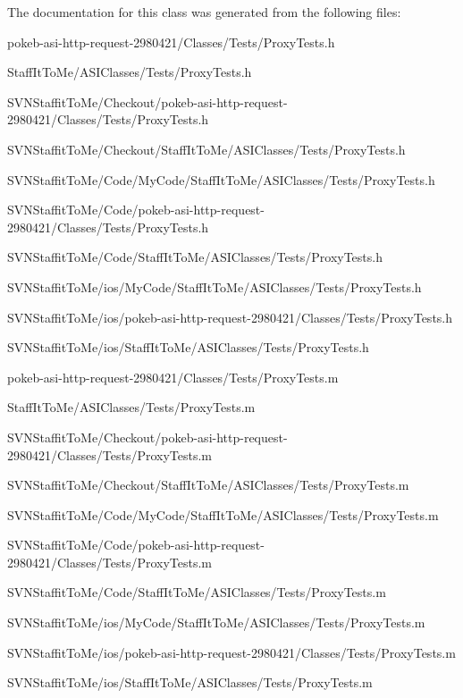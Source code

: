 \-The documentation for this class was generated from the following files\-:\begin{DoxyCompactItemize}
\item 
pokeb-\/asi-\/http-\/request-\/2980421/\-Classes/\-Tests/\-Proxy\-Tests.\-h\item 
\-Staff\-It\-To\-Me/\-A\-S\-I\-Classes/\-Tests/\-Proxy\-Tests.\-h\item 
\-S\-V\-N\-Staffit\-To\-Me/\-Checkout/pokeb-\/asi-\/http-\/request-\/2980421/\-Classes/\-Tests/\-Proxy\-Tests.\-h\item 
\-S\-V\-N\-Staffit\-To\-Me/\-Checkout/\-Staff\-It\-To\-Me/\-A\-S\-I\-Classes/\-Tests/\-Proxy\-Tests.\-h\item 
\-S\-V\-N\-Staffit\-To\-Me/\-Code/\-My\-Code/\-Staff\-It\-To\-Me/\-A\-S\-I\-Classes/\-Tests/\-Proxy\-Tests.\-h\item 
\-S\-V\-N\-Staffit\-To\-Me/\-Code/pokeb-\/asi-\/http-\/request-\/2980421/\-Classes/\-Tests/\-Proxy\-Tests.\-h\item 
\-S\-V\-N\-Staffit\-To\-Me/\-Code/\-Staff\-It\-To\-Me/\-A\-S\-I\-Classes/\-Tests/\-Proxy\-Tests.\-h\item 
\-S\-V\-N\-Staffit\-To\-Me/ios/\-My\-Code/\-Staff\-It\-To\-Me/\-A\-S\-I\-Classes/\-Tests/\-Proxy\-Tests.\-h\item 
\-S\-V\-N\-Staffit\-To\-Me/ios/pokeb-\/asi-\/http-\/request-\/2980421/\-Classes/\-Tests/\-Proxy\-Tests.\-h\item 
\-S\-V\-N\-Staffit\-To\-Me/ios/\-Staff\-It\-To\-Me/\-A\-S\-I\-Classes/\-Tests/\-Proxy\-Tests.\-h\item 
pokeb-\/asi-\/http-\/request-\/2980421/\-Classes/\-Tests/\-Proxy\-Tests.\-m\item 
\-Staff\-It\-To\-Me/\-A\-S\-I\-Classes/\-Tests/\-Proxy\-Tests.\-m\item 
\-S\-V\-N\-Staffit\-To\-Me/\-Checkout/pokeb-\/asi-\/http-\/request-\/2980421/\-Classes/\-Tests/\-Proxy\-Tests.\-m\item 
\-S\-V\-N\-Staffit\-To\-Me/\-Checkout/\-Staff\-It\-To\-Me/\-A\-S\-I\-Classes/\-Tests/\-Proxy\-Tests.\-m\item 
\-S\-V\-N\-Staffit\-To\-Me/\-Code/\-My\-Code/\-Staff\-It\-To\-Me/\-A\-S\-I\-Classes/\-Tests/\-Proxy\-Tests.\-m\item 
\-S\-V\-N\-Staffit\-To\-Me/\-Code/pokeb-\/asi-\/http-\/request-\/2980421/\-Classes/\-Tests/\-Proxy\-Tests.\-m\item 
\-S\-V\-N\-Staffit\-To\-Me/\-Code/\-Staff\-It\-To\-Me/\-A\-S\-I\-Classes/\-Tests/\-Proxy\-Tests.\-m\item 
\-S\-V\-N\-Staffit\-To\-Me/ios/\-My\-Code/\-Staff\-It\-To\-Me/\-A\-S\-I\-Classes/\-Tests/\-Proxy\-Tests.\-m\item 
\-S\-V\-N\-Staffit\-To\-Me/ios/pokeb-\/asi-\/http-\/request-\/2980421/\-Classes/\-Tests/\-Proxy\-Tests.\-m\item 
\-S\-V\-N\-Staffit\-To\-Me/ios/\-Staff\-It\-To\-Me/\-A\-S\-I\-Classes/\-Tests/\-Proxy\-Tests.\-m\end{DoxyCompactItemize}
